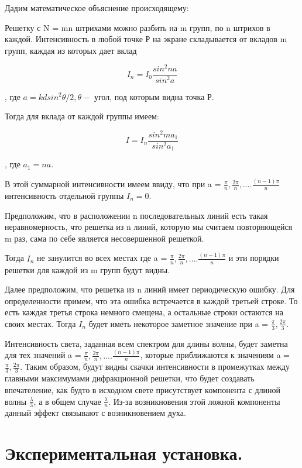 \documentclass[a4paper,12pt]{article}
\begin{document}
Дадим математическое объяснение происходящему:


  Решетку с N = mn штрихами можно разбить на m групп, по n штрихов в каждой. Интенсивность в любой точке Р на экране складывается от вкладов m групп, каждая из которых дает вклад
  
  \[I_n = I_0 \frac{sin^2 na}{sin^2 a}\]
  
  , где $a = kdsin^2 \theta/ 2, \theta -$ угол, под которым видна точка Р.
  
  Тогда для вклада от каждой группы имеем:
  
  \[I = I_n \frac{sin^2 ma_1}{sin^2 a_1}\]
  
 , где $a_1 = na$.
 
 В этой суммарной интенсивности имеем ввиду, что при a = $\frac{\pi}{n}, \frac{2\pi}{n}, .... \frac{(n-1)\pi}{n}$ интенсивность отдельной группы $I_n = 0$.
 
 
Предположим, что в расположении n последовательных линий есть такая неравномерность, что решетка из n линий, которую мы считаем повторяющейся m раз, сама по себе является несовершенной решеткой.

Тогда $I_n$ не занулится во всех местах где a = $\frac{\pi}{n}, \frac{2\pi}{n}, .... \frac{(n-1)\pi}{n}$ и эти порядки решетки для каждой из m групп будут видны. 
  
  Далее предположим, что решетка из n линий имеет периодическую ошибку. Для определенности примем, что эта ошибка встречается в каждой третьей строке. То есть каждая третья строка немного смещена, а остальные строки остаются на своих местах. Тогда $I_n$ будет иметь некоторое заметное значение при a = $\frac{\pi}{3}, \frac{2\pi}{3}$.
  
  
  Интенсивность света, заданная всем спектром для длины волны, будет заметна для тех значений a = $\frac{\pi}{n}, \frac{2\pi}{n}, .... \frac{(n-1)\pi}{n}$, которые приближаются к значениям a = $\frac{\pi}{3}, \frac{2\pi}{3}$. Таким образом, будут видны скачки интенсивности в промежутках между главными максимумами дифракционной решетки, что будет создавать впечателение, как будто в исходном свете присутствует компонента с длиной волны $\frac{\lambda}{3}$, а в общем случае $\frac{\lambda}{n}$. Из-за возникновения этой ложной компоненты данный эффект связывают с возникновением духа.
  
  

\section{Экспериментальная установка.} 
\end{document}
